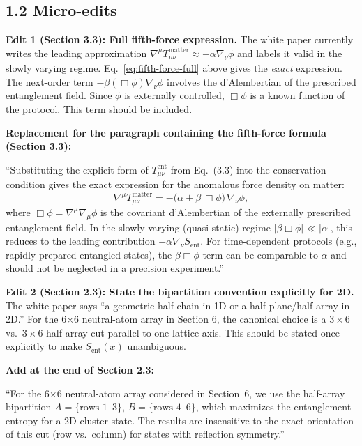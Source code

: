 \documentclass[12pt,letterpaper]{article}
\theoremstyle{plain}
\theoremstyle{definition}
\newcommand{\Sent}{S_{\mathrm{ent}}}
\begin{document}
\subsection*{1.2 Micro-edits}

\textbf{Edit 1 (Section 3.3): Full fifth-force expression.}
The white paper currently writes the leading approximation
$\nabla^\mu T^{\mathrm{matter}}_{\mu\nu} \approx -\alpha\nabla_\nu\phi$
and labels it valid in the slowly varying regime.  Eq.~\eqref{eq:fifth-force-full} above gives the \emph{exact} expression.  The next-order term $-\beta(\Box\phi)\nabla_\nu\phi$ involves the d'Alembertian of the prescribed entanglement field.  Since $\phi$ is externally controlled, $\Box\phi$ is a known function of the protocol. This term should be included.

\begin{editbox}
\textbf{Replacement for the paragraph containing the fifth-force formula (Section 3.3):}

``Substituting the explicit form of $T^{\mathrm{ent}}_{\mu\nu}$ from Eq.~(3.3) into the conservation condition gives the exact expression for the anomalous force density on matter:
\begin{equation*}
  \nabla^\mu T^{\mathrm{matter}}_{\mu\nu}
  = -\bigl(\alpha + \beta\,\Box\phi\bigr)\,\nabla_\nu\phi,
\end{equation*}
where $\Box\phi = \nabla^\mu\nabla_\mu\phi$ is the covariant d'Alembertian of the externally prescribed entanglement field.  In the slowly varying (quasi-static) regime $|\beta\Box\phi| \ll |\alpha|$, this reduces to the leading contribution $-\alpha\nabla_\nu\Sent$.  For time-dependent protocols (e.g., rapidly prepared entangled states), the $\beta\Box\phi$ term can be comparable to $\alpha$ and should not be neglected in a precision experiment.''
\end{editbox}

\textbf{Edit 2 (Section 2.3): State the bipartition convention explicitly for 2D.}
The white paper says ``a geometric half-chain in 1D or a half-plane/half-array in 2D.''  For the 6$\times$6 neutral-atom array in Section 6, the canonical choice is a $3\times 6$ vs.\ $3\times 6$ half-array cut parallel to one lattice axis.  This should be stated once explicitly to make $\Sent(x)$ unambiguous.

\begin{editbox}
\textbf{Add at the end of Section 2.3:}

``For the 6$\times$6 neutral-atom array considered in Section~6, we use the half-array bipartition $A = \{\text{rows } 1\text{--}3\}$, $B = \{\text{rows } 4\text{--}6\}$, which maximizes the entanglement entropy for a 2D cluster state.  The results are insensitive to the exact orientation of this cut (row vs.\ column) for states with reflection symmetry.''
\end{editbox}
\end{document}
